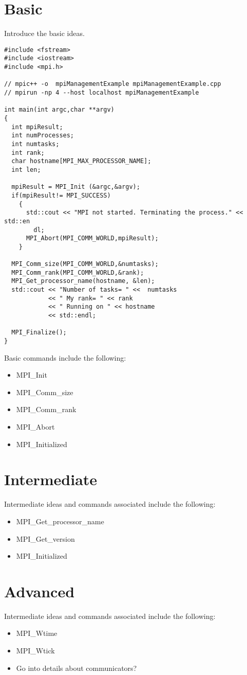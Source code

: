
\section{Basic}

Introduce the basic ideas.

\lstset{language=C++, numbers=left, numberstyle=\tiny, stepnumber=1,
  numbersep=5pt, commentstyle=\scriptsize}
\begin{lstlisting}[caption={Basic Process Information},
                   basicstyle=\scriptsize,
                   label=listing:touch]
#include <fstream>
#include <iostream>
#include <mpi.h>

// mpic++ -o  mpiManagementExample mpiManagementExample.cpp 
// mpirun -np 4 --host localhost mpiManagementExample

int main(int argc,char **argv)
{
  int mpiResult;
  int numProcesses;
  int numtasks;
  int rank;
  char hostname[MPI_MAX_PROCESSOR_NAME];
  int len;

  mpiResult = MPI_Init (&argc,&argv);
  if(mpiResult!= MPI_SUCCESS)
    {
      std::cout << "MPI not started. Terminating the process." << std::en
        dl;
      MPI_Abort(MPI_COMM_WORLD,mpiResult);
    }

  MPI_Comm_size(MPI_COMM_WORLD,&numtasks);
  MPI_Comm_rank(MPI_COMM_WORLD,&rank);
  MPI_Get_processor_name(hostname, &len);
  std::cout << "Number of tasks= " <<  numtasks
            << " My rank= " << rank
            << " Running on " << hostname
            << std::endl;

  MPI_Finalize();
}
\end{lstlisting}

Basic commands include the following: \\
\begin{itemize}
\item MPI_Init
\item MPI_Comm_size
\item MPI_Comm_rank
\item MPI_Abort
\item MPI_Initialized
\end{itemize}


\section{Intermediate}

Intermediate ideas and commands associated include the following: \\
\begin{itemize}
\item MPI_Get_processor_name
\item MPI_Get_version
\item MPI_Initialized
\end{itemize}

\section{Advanced}

Intermediate ideas and commands associated include the following: \\
\begin{itemize}
\item MPI_Wtime
\item MPI_Wtick
\item Go into details about communicators?
\end{itemize}


